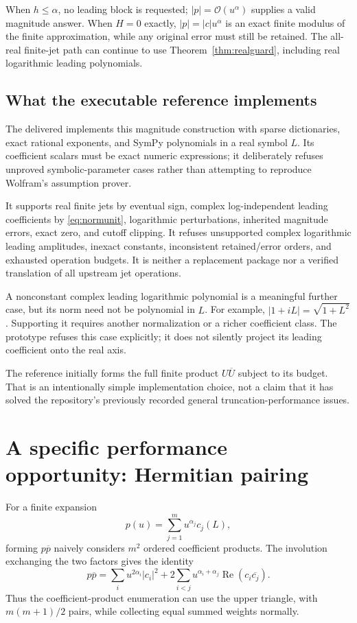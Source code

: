 \documentclass[11pt]{article}
\newcommand{\code}[1]{\texttt{\detokenize{#1}}}
\newcommand{\OO}{\mathcal O}
\theoremstyle{remark}\newtheorem{remark}[theorem]{Remark}
\begin{document}
When \(h\le\alpha\), no leading block is requested; \(|p|=\OO(u^\alpha)\) supplies
a valid magnitude answer. When \(H=0\) exactly, \(|p|=|c|u^\alpha\) is an exact
finite modulus of the finite approximation, while any original error must
still be retained. The all-real finite-jet path can continue to use
Theorem~\ref{thm:realguard}, including real logarithmic leading polynomials.

\subsection{What the executable reference implements}
The delivered \code{code/modulus_jet.py} implements this magnitude construction
with sparse dictionaries, exact rational exponents, and SymPy polynomials in
a real symbol \(L\). Its coefficient scalars must be exact numeric expressions;
it deliberately refuses unproved symbolic-parameter cases rather than attempting
to reproduce Wolfram's assumption prover.

It supports real finite jets by eventual sign, complex log-independent leading
coefficients by \eqref{eq:normunit}, logarithmic perturbations, inherited magnitude
errors, exact zero, and cutoff clipping. It refuses unsupported complex
logarithmic leading amplitudes, inexact constants, inconsistent retained/error
orders, and exhausted operation budgets. It is neither a replacement package
nor a verified translation of all upstream jet operations.

A nonconstant complex leading logarithmic polynomial is a meaningful further
case, but its norm need not be polynomial in \(L\). For example,
\(|1+iL|=\sqrt{1+L^2}\). Supporting it requires another normalization or a richer
coefficient class. The prototype refuses this case explicitly; it does not
silently project its leading coefficient onto the real axis.

The reference initially forms the full finite product \(U\overline U\) subject
to its budget. That is an intentionally simple implementation choice, not a
claim that it has solved the repository's previously recorded general
truncation-performance issues.

\section{A specific performance opportunity: Hermitian pairing}
For a finite expansion
\[
 p(u)=\sum_{j=1}^{m}u^{\alpha_j}c_j(L),
\]
forming \(p\overline p\) naively considers \(m^2\) ordered coefficient products.
The involution exchanging the two factors gives the identity
\begin{equation}\label{eq:hermitian}
 p\overline p=
 \sum_i u^{2\alpha_i}|c_i|^2+
 2\sum_{i<j}u^{\alpha_i+\alpha_j}
       \operatorname{Re}(c_i\overline{c_j}).
\end{equation}
Thus the coefficient-product enumeration can use the upper triangle, with
\(m(m+1)/2\) pairs, while collecting equal summed weights normally.
\end{document}
